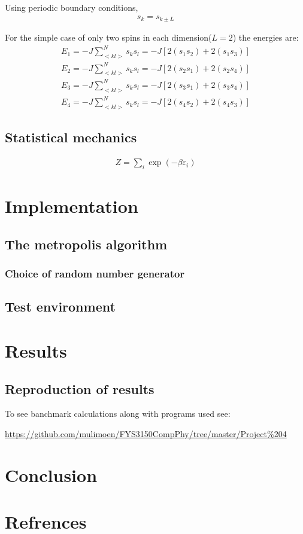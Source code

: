 \documentclass[11pt,a4paper,english,final]{article}
\numberwithin{equation}{section}
\begin{document}
Using periodic boundary conditions,
\begin{gather}
s_k = s_{k \pm L}
\end{gather}

For the simple case of only two spins in each dimension($L=2$) the energies are:
\begin{align*}
E_1 = -J\sum_{<kl>}^{N}s_k s_l = -J[2(s_1 s_2)+2(s_1 s_3)] \\
E_2 = -J\sum_{<kl>}^{N}s_k s_l = -J[2(s_2 s_1)+2(s_2 s_4)] \\
E_3 = -J\sum_{<kl>}^{N}s_k s_l = -J[2(s_3 s_1)+2(s_3 s_4)] \\
E_4 = -J\sum_{<kl>}^{N}s_k s_l = -J[2(s_4 s_2)+2(s_4 s_3)] 
\end{align*}


\subsection{Statistical mechanics}
\begin{gather}
Z = \sum_i \exp(-\beta\varepsilon_i)
\end{gather}

\section{Implementation}

\subsection{The metropolis algorithm}

\subsubsection{Choice of random number generator}

\subsection{Test environment}

\section{Results}

\subsection{Reproduction of results}

To see banchmark calculations along with programs used see:

\url{https://github.com/mulimoen/FYS3150CompPhy/tree/master/Project\%204}


\section{Conclusion}

\section{Refrences}
\end{document}
